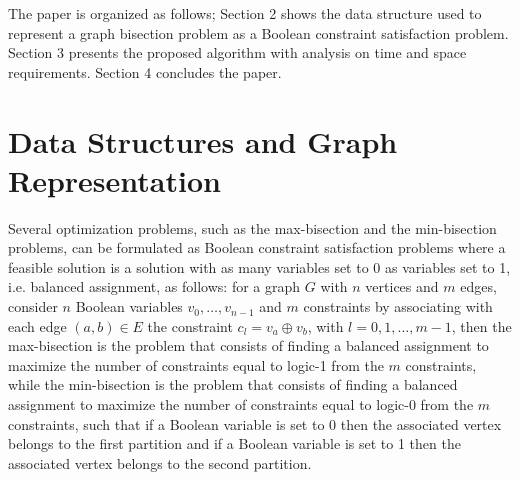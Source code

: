 \documentclass[a4paper]{article}
\begin{document}
The paper is organized as follows; Section 2 shows the data structure used to represent a graph bisection problem 
as a Boolean constraint satisfaction 
problem. Section 3 presents the proposed algorithm with analysis on time and space requirements. 
Section 4 concludes the paper. 


\section{Data Structures and Graph Representation}

Several optimization problems, such as the max-bisection and the min-bisection problems, can be formulated as Boolean constraint satisfaction
problems \cite{CombOptBook,BAZ05} where a feasible solution is a solution with as many variables set to 0
as variables set to 1, i.e. balanced assignment, as follows: 
for a graph $G$ with $n$ vertices and $m$ edges, consider $n$ Boolean variables $v_0, \ldots , v_{n-1}$
and $m$ constraints by associating with each edge $(a, b) \in E$ the constraint $c_l=v_a\oplus v_b$, with $l=0,1,\ldots,m-1$, 
then the max-bisection is the problem that consists of finding a balanced assignment 
to maximize the number of constraints equal to logic-1 from the $m$ constraints, 
while the min-bisection is the problem that consists of finding a balanced assignment to 
maximize the number of constraints equal to logic-0 from the $m$ constraints, such that 
if a Boolean variable is set to 0 then the associated vertex belongs to the first partition and 
if a Boolean variable is set to 1 then the associated vertex belongs to the second partition.
\end{document}
